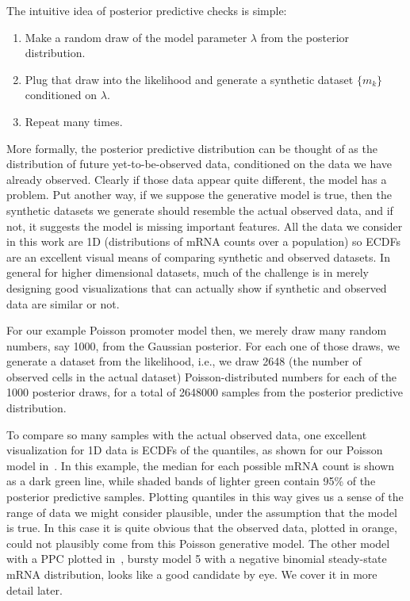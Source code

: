 The intuitive idea of posterior predictive checks is simple: 
\begin{enumerate}
\item Make a random draw of the model parameter $\lambda$ from the posterior
distribution.
\item Plug that draw into the likelihood and generate a synthetic dataset
$\{m_k\}$ conditioned on $\lambda$.
\item Repeat many times.
\end{enumerate}
More formally, the posterior predictive distribution can be thought of as the
distribution of future yet-to-be-observed data, conditioned on the data we have
already observed. Clearly if those data appear quite different, the model has a
problem. Put another way, if we suppose the generative model is true, then the
synthetic datasets we generate should resemble the actual observed data, and if
not, it suggests the model is missing important features. All the data we
consider in this work are 1D (distributions of mRNA counts over a population) so
ECDFs are an excellent visual means of comparing synthetic and observed
datasets. In general for higher dimensional datasets, much of the challenge is
in merely designing good visualizations that can actually show if synthetic and
observed data are similar or not.

For our example Poisson promoter model then, we merely draw many random numbers,
say 1000, from the Gaussian posterior. For each one of those draws, we generate
a dataset from the likelihood, i.e., we draw 2648 (the number of observed cells
in the actual dataset) Poisson-distributed numbers for each of the 1000
posterior draws, for a total of 2648000 samples from the posterior predictive
distribution.

To compare so many samples with the actual observed data, one excellent
visualization for 1D data is ECDFs of the quantiles, as shown for our Poisson
model in~.
In this example, the median for each possible mRNA
count is shown as a dark green line, while shaded bands of lighter
green contain 95\% of the posterior predictive samples.
Plotting quantiles in this way gives us a sense of the range of data we might
consider plausible, under the assumption that the model is true. In this case it
is quite obvious that the observed data, plotted in orange, could not plausibly
come from this Poisson generative model. The other model with a PPC plotted
in~, bursty model 5 with
a negative binomial steady-state mRNA
distribution, looks like a good candidate by eye. We cover it in more detail
later.

